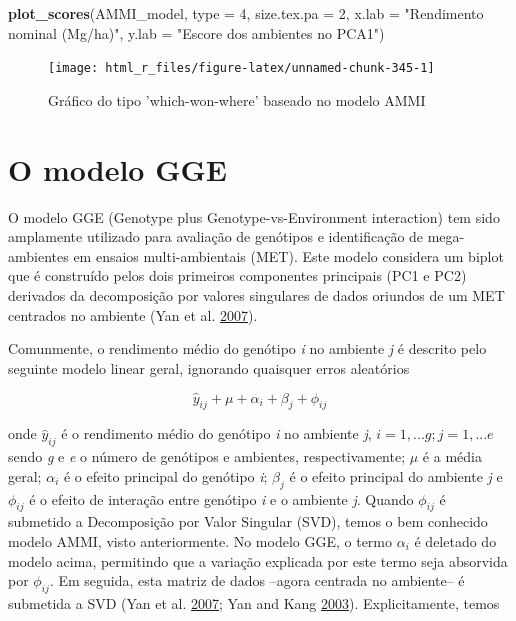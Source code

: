 \documentclass[
]{book}
\newenvironment{Shaded}{\begin{snugshade}}{\end{snugshade}}
\newcommand{\DataTypeTok}[1]{\textcolor[rgb]{0.13,0.29,0.53}{#1}}
\newcommand{\DecValTok}[1]{\textcolor[rgb]{0.00,0.00,0.81}{#1}}
\newcommand{\KeywordTok}[1]{\textcolor[rgb]{0.13,0.29,0.53}{\textbf{#1}}}
\newcommand{\NormalTok}[1]{#1}
\newcommand{\StringTok}[1]{\textcolor[rgb]{0.31,0.60,0.02}{#1}}
\numberwithin{equation}{section}
\newcommand{\indt}[1]{\index{#1|ST}}
\begin{document}
\begin{Shaded}
\begin{Highlighting}[]
\KeywordTok{plot\_scores}\NormalTok{(AMMI\_model,}
            \DataTypeTok{type =} \DecValTok{4}\NormalTok{,}
            \DataTypeTok{size.tex.pa =} \DecValTok{2}\NormalTok{,}
            \DataTypeTok{x.lab =} \StringTok{"Rendimento nominal (Mg/ha)"}\NormalTok{,}
            \DataTypeTok{y.lab =} \StringTok{"Escore dos ambientes no PCA1"}\NormalTok{)}
\end{Highlighting}
\end{Shaded}

\begin{figure}

{\centering \texttt{[image: html\_r\_files/figure-latex/unnamed-chunk-345-1]} 

}

\caption{Gráfico do tipo 'which-won-where' baseado no modelo AMMI}\label{fig:unnamed-chunk-345}
\end{figure}

\hypertarget{o-modelo-gge}{%
\section{O modelo GGE}\label{o-modelo-gge}}

\indt{GGE}

O modelo GGE (Genotype plus Genotype-vs-Environment interaction) tem sido amplamente utilizado para avaliação de genótipos e identificação de mega-ambientes em ensaios multi-ambientais (MET). Este modelo considera um biplot que é construído pelos dois primeiros componentes principais (PC1 e PC2) derivados da decomposição por valores singulares de dados oriundos de um MET centrados no ambiente (Yan et al. \protect\hyperlink{ref-Yan2007}{2007}).

Comunmente, o rendimento médio do genótipo \emph{i} no ambiente \emph{j} é descrito pelo seguinte modelo linear geral, ignorando quaisquer erros aleatórios

\[
\hat y_{ij} + \mu + \alpha_i + \beta_j + \phi_{ij}
\]

onde \(\hat y_{ij}\) é o rendimento médio do genótipo \emph{i} no ambiente \emph{j}, \(i = 1, ... g; j = 1, ... e\) sendo \emph{g} e \emph{e} o número de genótipos e ambientes, respectivamente; \(\mu\) é a média geral; \(\alpha_i\) é o efeito principal do genótipo \emph{i}; \(\beta_j\) é o efeito principal do ambiente \emph{j} e \(\phi_{ij}\) é o efeito de interação entre genótipo \emph{i} e o ambiente \emph{j}. Quando \(\phi_{ij}\) é submetido a Decomposição por Valor Singular (SVD), temos o bem conhecido modelo AMMI, visto anteriormente. No modelo GGE, o termo \(\alpha_i\) é deletado do modelo acima, permitindo que a variação explicada por este termo seja absorvida por \(\phi_{ij}\). Em seguida, esta matriz de dados --agora centrada no ambiente-- é submetida a SVD (Yan et al. \protect\hyperlink{ref-Yan2007}{2007}; Yan and Kang \protect\hyperlink{ref-Yan2003}{2003}). Explicitamente, temos
\end{document}

